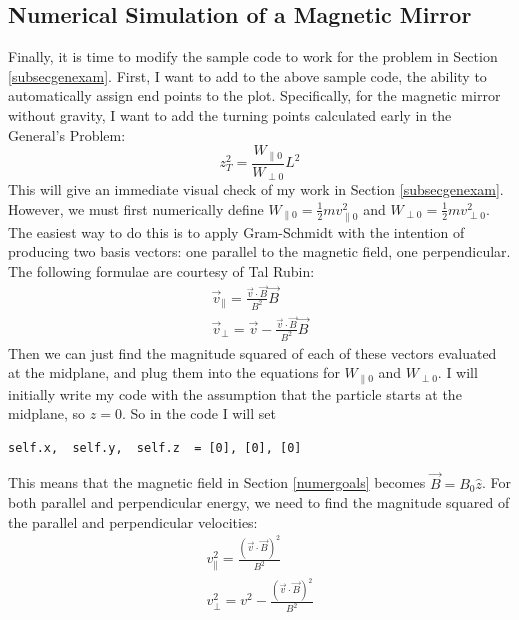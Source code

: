\documentclass[12pt]{article}
\begin{document}
\subsection{Numerical Simulation of a Magnetic Mirror}
Finally, it is time to modify the sample code to work for the problem in Section \ref{subsecgenexam}. First, I want to add to the above sample code, the ability to automatically assign end points to the plot. Specifically, for the magnetic mirror without gravity, I want to add the turning points calculated early in the General's Problem:
\begin{equation}\label{nogravturnpts}
z_T^2=\frac{W_{\parallel0}}{W_{\perp0}}L^2
\end{equation}
This will give an immediate visual check of my work in Section \ref{subsecgenexam}. However, we must first numerically define $W_{\parallel0}=\frac{1}{2}mv_{\parallel0}^2$ and $W_{\perp0}=\frac{1}{2}mv_{\perp0}^2$. The easiest way to do this is to apply Gram-Schmidt with the intention of producing two basis vectors: one parallel to the magnetic field, one perpendicular. The following formulae are courtesy of Tal Rubin:
\begin{equation}\label{paraperpvelocities}
\begin{split}
\vec{v}_{\parallel}=\frac{\vec{v}\cdot\vec{B}}{B^2}\vec{B}\\
\vec{v}_{\perp}=\vec{v}-\frac{\vec{v}\cdot\vec{B}}{B^2}\vec{B}
\end{split}
\end{equation}
Then we can just find the magnitude squared of each of these vectors evaluated at the midplane, and plug them into the equations for $W_{\parallel0}$ and $W_{\perp0}$. I will initially write my code with the assumption that the particle starts at the midplane, so  $z=0$. So in the code I will set
\begin{verbatim}
self.x,  self.y,  self.z  = [0], [0], [0]
\end{verbatim} 
This means that the magnetic field in Section \ref{numergoals} becomes $\vec{B}=B_0\hat{z}$. For both parallel and perpendicular energy, we need to find the magnitude squared of the parallel and perpendicular velocities:
\begin{equation}\label{paraperpmags}
\begin{split}
v_{\parallel}^2=\frac{(\vec{v}\cdot\vec{B})^2}{B^2}\\
v_{\perp}^2=v^2-\frac{(\vec{v}\cdot\vec{B})^2}{B^2}
\end{split}
\end{equation}
\end{document}
